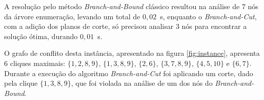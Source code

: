 \documentclass{article}
\begin{document}
    
    A resolução pelo método \emph{Branch-and-Bound} clássico resultou na análise de 7 nós da árvore enumeração, levando um total de $0{,}02$~s, enquanto o \emph{Branch-and-Cut}, com a adição dos planos de corte, só precisou analisar 3 nós para encontrar a solução ótima, durando $0{,}01$~s. 
    
    O grafo de conflito desta instância, apresentado na figura \ref{fig:instance}, apresenta 6 cliques maximais: $\{1, 2, 8, 9\}$, $\{1, 3, 8, 9\}$, $\{2, 6\}$, $\{3, 7, 8, 9\}$, $\{4, 5, 10\}$ e $\{6, 7\}$.
    Durante a execução do algoritmo \emph{Branch-and-Cut} foi aplicando um corte, dado pela clique $\{ 1, 3, 8, 9 \}$, que foi violada na análise de um dos nós do \emph{Branch-and-Bound}.
    
\end{document}
